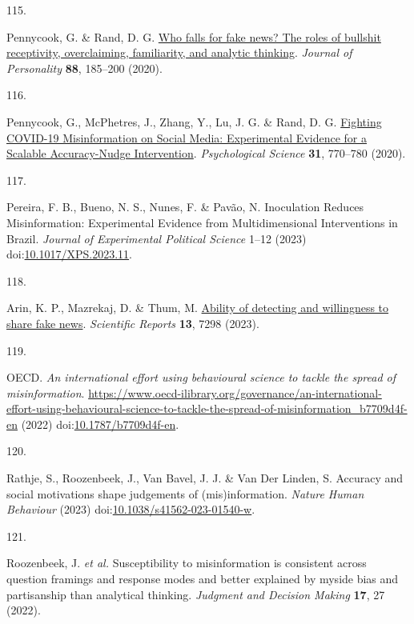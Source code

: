 \documentclass[
  man]{apa6}
\newlength{\cslhangindent}
\newlength{\csllabelwidth}
\newenvironment{CSLReferences}[2] %
 {\begin{list}{}{%
  \setlength{\itemindent}{0pt}
  \setlength{\leftmargin}{0pt}
  \setlength{\parsep}{0pt}
  \ifodd #1
   \setlength{\leftmargin}{\cslhangindent}
   \setlength{\itemindent}{-1\cslhangindent}
  \fi
  \setlength{\itemsep}{#2\baselineskip}}}
 {\end{list}}
\newcommand{\CSLLeftMargin}[1]{\parbox[t]{\csllabelwidth}{\strut#1\strut}}
\newcommand{\CSLRightInline}[1]{\parbox[t]{\linewidth - \csllabelwidth}{\strut#1\strut}}
\begin{document}
\begin{CSLReferences}{0}{0}
\CSLLeftMargin{115. }%
\CSLRightInline{*Pennycook, G. \& Rand, D. G. \href{https://doi.org/10.1111/jopy.12476}{Who falls for fake news? The roles of bullshit receptivity, overclaiming, familiarity, and analytic thinking}. \emph{Journal of Personality} \textbf{88}, 185--200 (2020).}

\CSLLeftMargin{116. }%
\CSLRightInline{*Pennycook, G., McPhetres, J., Zhang, Y., Lu, J. G. \& Rand, D. G. \href{https://doi.org/10.1177/0956797620939054}{Fighting COVID-19 Misinformation on Social Media: Experimental Evidence for a Scalable Accuracy-Nudge Intervention}. \emph{Psychological Science} \textbf{31}, 770--780 (2020).}

\CSLLeftMargin{117. }%
\CSLRightInline{*Pereira, F. B., Bueno, N. S., Nunes, F. \& Pavão, N. Inoculation Reduces Misinformation: Experimental Evidence from Multidimensional Interventions in Brazil. \emph{Journal of Experimental Political Science} 1--12 (2023) doi:\href{https://doi.org/10.1017/XPS.2023.11}{10.1017/XPS.2023.11}.}

\CSLLeftMargin{118. }%
\CSLRightInline{*Arin, K. P., Mazrekaj, D. \& Thum, M. \href{https://doi.org/10.1038/s41598-023-34402-6}{Ability of detecting and willingness to share fake news}. \emph{Scientific Reports} \textbf{13}, 7298 (2023).}

\CSLLeftMargin{119. }%
\CSLRightInline{*OECD. \emph{An international effort using behavioural science to tackle the spread of misinformation}. \url{https://www.oecd-ilibrary.org/governance/an-international-effort-using-behavioural-science-to-tackle-the-spread-of-misinformation_b7709d4f-en} (2022) doi:\href{https://doi.org/10.1787/b7709d4f-en}{10.1787/b7709d4f-en}.}

\CSLLeftMargin{120. }%
\CSLRightInline{*Rathje, S., Roozenbeek, J., Van Bavel, J. J. \& Van Der Linden, S. Accuracy and social motivations shape judgements of (mis)information. \emph{Nature Human Behaviour} (2023) doi:\href{https://doi.org/10.1038/s41562-023-01540-w}{10.1038/s41562-023-01540-w}.}

\CSLLeftMargin{121. }%
\CSLRightInline{*Roozenbeek, J. \emph{et al.} Susceptibility to misinformation is consistent across question framings and response modes and better explained by myside bias and partisanship than analytical thinking. \emph{Judgment and Decision Making} \textbf{17}, 27 (2022).}


\end{CSLReferences}
\end{document}
